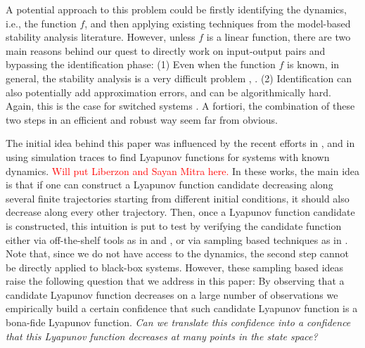 A potential approach to this problem could be firstly identifying the dynamics, i.e., the function $f$, and then applying existing techniques from the model-based stability analysis literature. However, unless $f$ is a linear function, there are two main reasons behind our quest to directly work on input-output pairs and bypassing the identification phase: (1) Even when the function $f$ is known, in general, the stability analysis is a very difficult problem \cite{stabilityHard1}, \cite{stabilityHard2}. (2) Identification can also potentially add approximation errors, and can be algorithmically hard. Again, this is the case for switched systems \cite{lauer}. A fortiori, the combination of these two steps in an efficient and robust way seem far from obvious.

The initial idea behind this paper was influenced by the recent efforts in \cite{topcu}, \cite{kapinski} and \cite{lazar} in using simulation traces to find Lyapunov functions for systems with known dynamics. \textcolor{red}{Will put Liberzon and Sayan Mitra here.} In these works, the main idea is that if one can construct a Lyapunov function candidate decreasing along several finite trajectories starting from different initial conditions, it should also decrease along every other trajectory. Then, once a Lyapunov function candidate is constructed, this intuition is put to test by verifying the candidate function either via off-the-shelf tools as in \cite{topcu} and \cite{kapinski}, or via sampling based techniques as in \cite{lazar}. Note that, since we do not have access to the dynamics, the second step cannot be directly applied to black-box systems. However, these sampling based ideas raise the following question that we address in this paper: By observing that a candidate Lyapunov function decreases on a large number of observations we empirically build a certain confidence that such candidate Lyapunov function is a bona-fide Lyapunov function. \emph{Can we translate this confidence into a confidence that this Lyapunov function decreases at many points in the state space?} 

